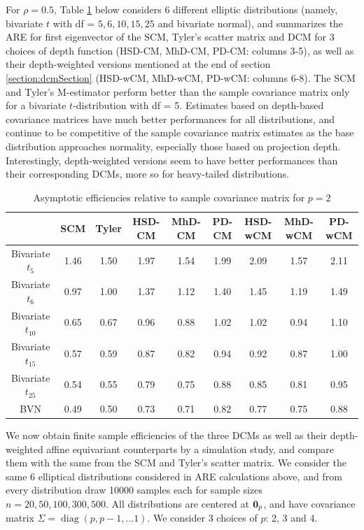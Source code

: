 \documentclass[fleqn,11pt]{article}
\DeclareMathOperator*{\diag}{diag}
\begin{document}
For $\rho=0.5$, Table \ref{table:AREtable} below considers 6 different elliptic distributions (namely, bivariate $t$ with df = $5,6,10,15,25$ and bivariate normal), and summarizes the ARE for first eigenvector of the SCM, Tyler's scatter matrix and DCM for 3 choices of depth function (HSD-CM, MhD-CM, PD-CM: columns 3-5), as well as their depth-weighted versions mentioned at the end of section \ref{section:dcmSection} (HSD-wCM, MhD-wCM, PD-wCM: columns 6-8). The SCM and Tyler's M-estimator perform better than the sample covariance matrix only for a bivariate $t$-distribution with df = 5. Estimates based on depth-based covariance matrices have much better performances for all distributions, and continue to be competitive of the sample covariance matrix estimates as the base distribution approaches normality, especially those based on projection depth. Interestingly, depth-weighted versions seem to have better performances than their corresponding DCMs, more so for heavy-tailed distributions.

\begin{table}
\begin{footnotesize}
    \begin{tabular}{c|cc|ccc|ccc}
     \hline
                       & SCM  & Tyler & HSD-CM & MhD-CM & PD-CM & HSD-wCM & MhD-wCM & PD-wCM \\ \hline
    Bivariate $t_5$    & 1.46 & 1.50  & 1.97   & 1.54   & 1.99  & 2.09    & 1.57    & 2.11   \\
    Bivariate $t_6$    & 0.97 & 1.00  & 1.37   & 1.12   & 1.40  & 1.45    & 1.19    & 1.49   \\
    Bivariate $t_{10}$ & 0.65 & 0.67  & 0.96   & 0.88   & 1.02  & 1.02    & 0.94    & 1.10   \\
    Bivariate $t_{15}$ & 0.57 & 0.59  & 0.87   & 0.82   & 0.94  & 0.92    & 0.87    & 1.00   \\
    Bivariate $t_{25}$ & 0.54 & 0.55  & 0.79   & 0.75   & 0.88  & 0.85    & 0.81    & 0.95   \\
    BVN   & 0.49 & 0.50  & 0.73   & 0.71   & 0.82  & 0.77    & 0.75    & 0.88   \\ \hline
    \end{tabular}
\end{footnotesize}
\caption{Asymptotic efficiencies relative to sample covariance matrix for $p=2$}
\label{table:AREtable}
\end{table}

We now obtain finite sample efficiencies of the three DCMs as well as their depth-weighted affine equivariant counterparts by a simulation study, and compare them with the same from the SCM and Tyler's scatter matrix. We consider the same 6 elliptical distributions considered in ARE calculations above, and from every distribution draw 10000 samples each for sample sizes $n = 20, 50, 100, 300, 500$. All distributions are centered at ${\bf 0}_p$, and have covariance matrix $\Sigma = \diag(p,p-1,...1)$. We consider 3 choices of $p$: 2, 3 and 4.
\end{document}
